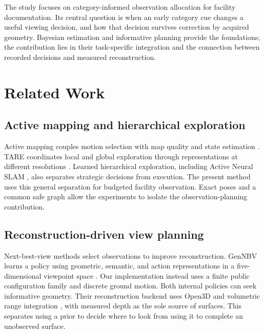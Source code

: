 \documentclass[pdflatex,sn-mathphys-num]{sn-jnl}
\begin{document}
The study focuses on category-informed observation allocation for facility documentation. Its central question is when an early category cue changes a useful viewing decision, and how that decision survives correction by acquired geometry. Bayesian estimation and informative planning provide the foundations; the contribution lies in their task-specific integration and the connection between recorded decisions and measured reconstruction.

\hypertarget{related-work}{%
\section{Related Work}\label{related-work}}

\hypertarget{active-mapping-and-hierarchical-exploration}{%
\subsection{Active mapping and hierarchical exploration}\label{active-mapping-and-hierarchical-exploration}}

Active mapping couples motion selection with map quality and state estimation \cite{ref10}. TARE coordinates local and global exploration through representations at different resolutions \cite{ref5}. Learned hierarchical exploration, including Active Neural SLAM \cite{ref1}, also separates strategic decisions from execution. The present method uses this general separation for budgeted facility observation. Exact poses and a common safe graph allow the experiments to isolate the observation-planning contribution.

\hypertarget{reconstruction-driven-view-planning}{%
\subsection{Reconstruction-driven view planning}\label{reconstruction-driven-view-planning}}

Next-best-view methods select observations to improve reconstruction. GenNBV learns a policy using geometric, semantic, and action representations in a five-dimensional viewpoint space \cite{ref6}. Our implementation instead uses a finite public configuration family and discrete ground motion. Both internal policies can seek informative geometry. Their reconstruction backend uses Open3D \cite{ref4} and volumetric range integration \cite{ref11}, with measured depth as the sole source of surfaces. This separates using a prior to decide where to look from using it to complete an unobserved surface.
\end{document}

